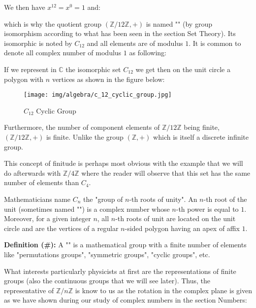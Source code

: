 \begin{enumerate}
		We then have $x^{12}=x^0=1$ and:
		
		which is why the quotient group $(\mathbb{Z}/12\mathbb{Z},+)$ is named "" (by group isomorphism according to what has been seen in the section Set Theory). Its isomorphic is noted by $C_{12}$ and all elements are of modulus $1$. It is common to denote all complex number of modulus $1$ as following:
		
		If we represent in $\mathbb{C}$ the isomorphic set $C_{12}$ we get then on the unit circle a polygon with $n$ vertices as shown in the figure below:
		\begin{figure}[H]
			\centering
			\texttt{[image: img/algebra/c\_12\_cyclic\_group.jpg]}
			\caption{$C_{12}$ Cyclic Group}
		\end{figure}
		Furthermore, the number of component elements of $\mathbb{Z}/12\mathbb{Z}$ being finite, $(\mathbb{Z}/12\mathbb{Z},+)$ is finite. Unlike the group $(\mathbb{Z},+)$ which is itself a discrete infinite group.
		
		This concept of finitude is perhaps most obvious with the example that we will do afterwards with $\mathbb{Z}/4\mathbb{Z}$ where the reader will observe that this set has the same number of elements than $C_4$.	
	\end{enumerate}
	
	\begin{tcolorbox}[title=Remark,colframe=black,arc=10pt]
	Mathematicians name $C_n$ the "group of $n$-th roots of unity". An $n$-th root of the unit (sometimes named "") is a complex number whose $n$-th power is equal to $1$. Moreover, for a given integer $n$, all $n$-th roots of unit are located on the unit circle and are the vertices of a regular $n$-sided polygon having an apex of affix $1$.
	\end{tcolorbox}
	
	\textbf{Definition (\#\mydef):} A "\label{finite group}" is a mathematical group with a finite number of elements like "permutations groups", "symmetric groups", "cyclic groups", etc.
	
	What interests particularly physicists at first are the representations of finite groups (also the continuous groups that we will see later). Thus, the representative of $\mathbb{Z}/n\mathbb{Z}$ is know to us as the rotation in the complex plane is given as we have shown during our study of complex numbers in the section Numbers:
	
